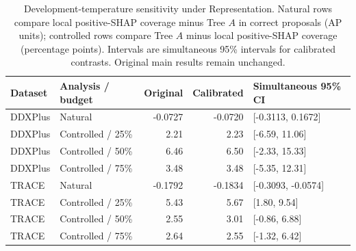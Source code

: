 \begin{table}[!tbp]\centering\footnotesize
\caption{Development-temperature sensitivity under Representation. Natural rows compare local positive-SHAP coverage minus Tree $A$ in correct proposals (AP units); controlled rows compare Tree $A$ minus local positive-SHAP coverage (percentage points). Intervals are simultaneous 95\% intervals for calibrated contrasts. Original main results remain unchanged.}
\label{tab:temperature-ranking}
\begin{tabular}{llrrl}\toprule
Dataset & Analysis / budget & Original & Calibrated & Simultaneous 95\% CI\\\midrule
DDXPlus & Natural & -0.0727 & -0.0720 & [-0.3113, 0.1672]\\
DDXPlus & Controlled / 25\% & 2.21 & 2.23 & [-6.59, 11.06]\\
DDXPlus & Controlled / 50\% & 6.46 & 6.50 & [-2.33, 15.33]\\
DDXPlus & Controlled / 75\% & 3.48 & 3.48 & [-5.35, 12.31]\\
TRACE & Natural & -0.1792 & -0.1834 & [-0.3093, -0.0574]\\
TRACE & Controlled / 25\% & 5.43 & 5.67 & [1.80, 9.54]\\
TRACE & Controlled / 50\% & 2.55 & 3.01 & [-0.86, 6.88]\\
TRACE & Controlled / 75\% & 2.64 & 2.55 & [-1.32, 6.42]\\
\bottomrule\end{tabular}\end{table}
